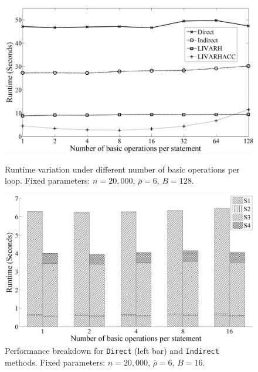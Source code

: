 \documentclass[11pt, twocolumn]{article}
\begin{document}
\begin{figure}[htbp]
\centering
\begin{minipage}[b]{0.48\linewidth}
\includegraphics[width=1\textwidth]{figures/HRfig1BW}
\caption[ Runtime Variation under Different Number of Basic Operations per Loop]
{Runtime variation under different number of basic operations per loop.
Fixed parameters: $n=20,000$, $\overline{\rho} = 6$, $B=128$. }
\label{fig:random-fig1}
\end{minipage}
\quad
\begin{minipage}[b]{0.48\linewidth}
\includegraphics[width=1\textwidth]{figures/HRfig2BW}
\caption[Performance Breakdown for {\tt Direct} and {\tt Indirect} under Varying Number of Basic Operations per Loop]
{Performance breakdown for {\tt Direct} (left bar) and {\tt Indirect} methods. 
Fixed parameters: $n=20,000$, $\overline{\rho} = 6$, $B=16$. }
\label{fig:random-fig2}
\end{minipage}
\end{figure}
\end{document}
